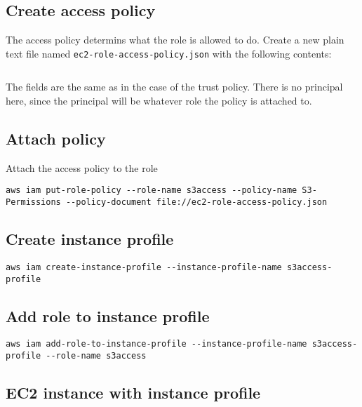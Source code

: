 \subsection{Create access policy}

The access policy determins what the role is allowed to do. 
Create a new plain text file named \texttt{ec2-role-access-policy.json} with the following contents:

\inputminted{json}{ec2-role-access-policy.json}

The fields are the same as in the case of the trust policy.
There is no principal here, since the principal will be whatever role the policy is attached to.

\subsection{Attach policy}

Attach the access policy to the role

\begin{verbatim}
aws iam put-role-policy --role-name s3access --policy-name S3-Permissions --policy-document file://ec2-role-access-policy.json
\end{verbatim}



\subsection{Create instance profile}

\begin{verbatim}
aws iam create-instance-profile --instance-profile-name s3access-profile
\end{verbatim}

\subsection{Add role to instance profile}

\begin{verbatim}
aws iam add-role-to-instance-profile --instance-profile-name s3access-profile --role-name s3access
\end{verbatim}

\subsection{EC2 instance with instance profile}

